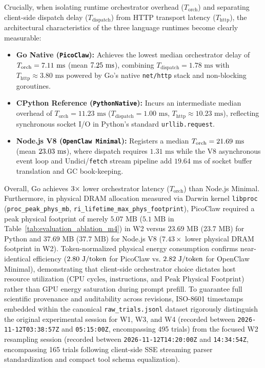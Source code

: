 \documentclass[preprint,12pt,3p]{elsarticle}
\begin{document}
Crucially, when isolating runtime orchestrator overhead ($T_{\text{orch}}$) and separating client-side dispatch delay ($T_{\text{dispatch}}$) from HTTP transport latency ($T_{\text{http}}$), the architectural characteristics of the three language runtimes become clearly measurable:
\begin{itemize}
    \item \textbf{Go Native (\texttt{PicoClaw}):} Achieves the lowest median orchestrator delay of $T_{\text{orch}} = 7.11\text{ ms}$ (mean $7.25\text{ ms}$), combining $T_{\text{dispatch}} = 1.78\text{ ms}$ with $T_{\text{http}} \approx 3.80\text{ ms}$ powered by Go's native \texttt{net/http} stack and non-blocking goroutines.
    \item \textbf{CPython Reference (\texttt{PythonNative}):} Incurs an intermediate median overhead of $T_{\text{orch}} = 11.23\text{ ms}$ ($T_{\text{dispatch}} = 1.00\text{ ms}$, $T_{\text{http}} \approx 10.23\text{ ms}$), reflecting synchronous socket I/O in Python's standard \texttt{urllib.request}.
    \item \textbf{Node.js V8 (\texttt{OpenClaw Minimal}):} Registers a median $T_{\text{orch}} = 21.69\text{ ms}$ (mean $23.03\text{ ms}$), where dispatch requires $1.31\text{ ms}$ while the V8 asynchronous event loop and Undici/\texttt{fetch} stream pipeline add $19.64\text{ ms}$ of socket buffer translation and GC book-keeping.
\end{itemize}
Overall, Go achieves $3\times$ lower orchestrator latency ($T_{\text{orch}}$) than Node.js Minimal. Furthermore, in physical DRAM allocation measured via Darwin kernel \texttt{libproc} (\texttt{proc\_peak\_phys\_mb}, \texttt{ri\_lifetime\_max\_phys\_footprint}), PicoClaw required a peak physical footprint of merely $5.07\text{ MB}$ ($5.1\text{ MB}$ in Table~\ref{tab:evaluation_ablation_m4}) in W2 versus $23.69\text{ MB}$ ($23.7\text{ MB}$) for Python and $37.69\text{ MB}$ ($37.7\text{ MB}$) for Node.js V8 ($7.43\times$ lower physical DRAM footprint in W2). Token-normalized physical energy consumption confirms near-identical efficiency ($2.80\text{ J/token}$ for PicoClaw vs. $2.82\text{ J/token}$ for OpenClaw Minimal), demonstrating that client-side orchestrator choice dictates host resource utilization ($\text{CPU cycles}$, $\text{instructions}$, and $\text{Peak Physical Footprint}$) rather than GPU energy saturation during prompt prefill. To guarantee full scientific provenance and auditability across revisions, ISO-8601 timestamps embedded within the canonical \texttt{raw\_trials.jsonl} dataset rigorously distinguish the original experimental session for W1, W3, and W4 (recorded between \texttt{2026-11-12T03:38:57Z} and \texttt{05:15:00Z}, encompassing 495 trials) from the focused W2 resampling session (recorded between \texttt{2026-11-12T14:20:00Z} and \texttt{14:34:54Z}, encompassing 165 trials following client-side SSE streaming parser standardization and compact tool schema equalization).
\end{document}
